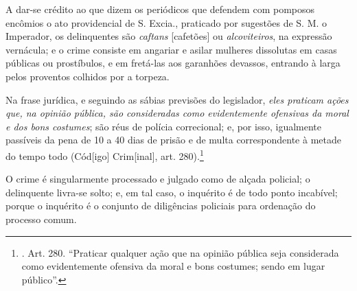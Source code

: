 A dar-se crédito ao que dizem os periódicos que defendem com pomposos
encômios o ato providencial de S. Excia., praticado por sugestões de S.
M. o Imperador, os delinquentes são \emph{caftans} {[}cafetões{]} ou
\emph{alcoviteiros}, na expressão vernácula; e o crime consiste em
angariar e asilar mulheres dissolutas em casas públicas ou prostíbulos,
e em fretá-las aos garanhões devassos, entrando à larga pelos proventos
colhidos por a torpeza.

Na frase jurídica, e seguindo as sábias previsões do legislador,
\emph{eles praticam ações que, na opinião pública, são consideradas como
evidentemente ofensivas da moral e dos bons costumes}; são réus de
polícia correcional; e, por isso, igualmente passíveis da pena de 10 a
40 dias de prisão e de multa correspondente à metade do tempo todo
(Cód{[}igo{]} Crim{[}inal{]}, art. 280).\footnote{. Art. 280. ``Praticar
  qualquer ação que na opinião pública seja considerada como
  evidentemente ofensiva da moral e bons costumes; sendo em lugar
  público''.}

O crime é singularmente processado e julgado como de alçada policial; o
delinquente livra-se solto; e, em tal caso, o inquérito é de todo ponto
incabível; porque o inquérito é o conjunto de diligências policiais para
ordenação do processo comum.

